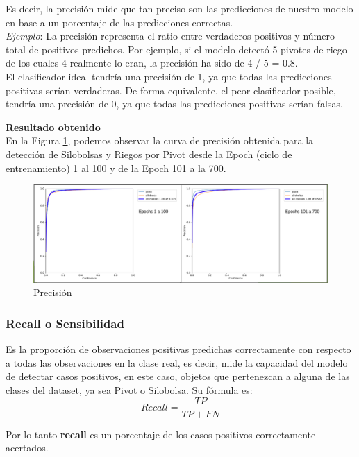 Es decir, la precisión mide que tan preciso son las predicciones de nuestro modelo en base a un porcentaje de las predicciones correctas.\\

\textit{Ejemplo}:
La precisión representa el ratio entre verdaderos positivos y número total de positivos predichos. Por ejemplo, si el modelo detectó 5 pivotes de riego de los cuales 4 realmente lo eran, la precisión ha sido de 4 / 5 = 0.8.\\
El clasificador ideal tendría una precisión de 1, ya que todas las predicciones positivas serían verdaderas.
De forma equivalente, el peor clasificador posible, tendría una precisión de 0, ya que todas las predicciones positivas serían falsas.

\newpage
\textbf{Resultado obtenido}\\

En la Figura \ref{fig:precision}, podemos observar la curva de precisión obtenida para la detección de Silobolsas y Riegos por Pivot desde la Epoch (ciclo de entrenamiento) 1 al 100 y de la Epoch 101 a la 700. 
\begin{figure}[h!]
    \centering
    \includegraphics[width=1\textwidth]{img/Precision.png}
    \caption{Precisión}
    \label{fig:precision}
\end{figure}

\subsubsection{Recall o Sensibilidad} 
Es la proporción de observaciones positivas predichas correctamente con respecto a todas las observaciones en la clase real, es decir, mide la capacidad del modelo de detectar casos positivos, en este caso,
objetos que pertenezcan a alguna de las clases del dataset, ya sea Pivot o Silobolsa. Su fórmula es:  \[Recall=\frac{TP}{TP + FN}\]  

Por lo tanto \textbf{recall} es un porcentaje de los casos positivos correctamente acertados.\\

